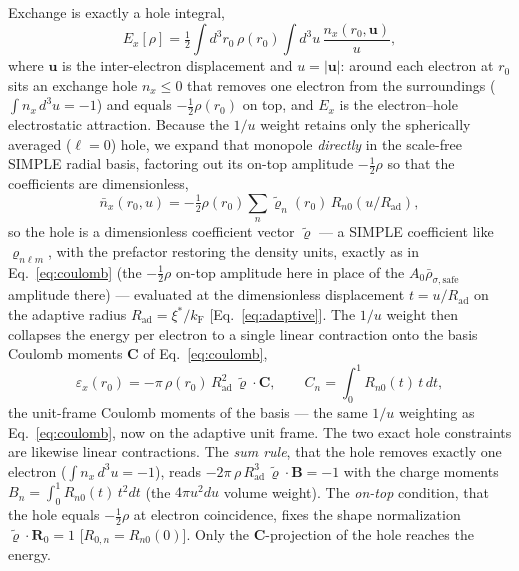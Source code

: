 \documentclass[aps,prb,reprint,superscriptaddress,nofootinbib]{revtex4-2}
\newcommand{\uu}{\mathbf{u}}
\newcommand{\kF}{k_{\mathrm{F}}}
\newcommand{\Rad}{R_{\mathrm{ad}}}
\begin{document}
Exchange is exactly a hole integral,
\begin{equation}
\label{eq:exact-hole}
E_x[\rho]=\tfrac12\int d^3r_0\,\rho(r_0)\!\int d^3u\,\frac{n_x(r_0,\uu)}{u},
\end{equation}
where $\uu$ is the inter-electron displacement and $u=|\uu|$: around each electron at $r_0$ sits an
exchange hole $n_x\le0$ that removes one electron from the surroundings ($\int n_x\,d^3u=-1$) and
equals $-\tfrac12\rho(r_0)$ on top, and $E_x$ is the electron--hole electrostatic attraction.
Because the $1/u$ weight retains only the spherically averaged ($\ell=0$) hole, we expand that
monopole \emph{directly} in the scale-free SIMPLE radial basis, factoring out its on-top amplitude
$-\tfrac12\rho$ so that the coefficients are dimensionless,
\begin{equation}
\label{eq:hole-direct}
\bar n_x(r_0,u)=-\tfrac12\rho(r_0)\sum_n \tilde\varrho_{n}(r_0)\,R_{n0}(u/\Rad),
\end{equation}
so the hole is a dimensionless coefficient vector $\tilde{\bm\varrho}$ --- a SIMPLE coefficient like
$\varrho_{n\ell m}$, with the prefactor restoring the density units, exactly as in
Eq.~\eqref{eq:coulomb} (the $-\tfrac12\rho$ on-top amplitude here in place of the
$A_0\bar\rho_{\sigma,\mathrm{safe}}$ amplitude there) --- evaluated at the dimensionless displacement
$t=u/\Rad$ on the adaptive radius $\Rad=\xi^*/\kF$ [Eq.~\eqref{eq:adaptive}]. The $1/u$ weight then
collapses the energy per electron
to a single linear contraction onto the basis Coulomb moments $\mathbf C$ of Eq.~\eqref{eq:coulomb},
\begin{equation}
\label{eq:eps-direct}
\varepsilon_x(r_0)=-\pi\,\rho(r_0)\,\Rad^2\,\tilde{\bm\varrho}\!\cdot\!\mathbf C,\qquad
C_{n}=\!\int_0^1\!R_{n0}(t)\,t\,dt ,
\end{equation}
the unit-frame Coulomb moments of the basis --- the same $1/u$ weighting as
Eq.~\eqref{eq:coulomb}, now on the adaptive unit frame. The two exact hole constraints are likewise
linear contractions. The \emph{sum rule}, that the hole removes exactly one electron
($\int n_x\,d^3u=-1$), reads $-2\pi\,\rho\,\Rad^3\,\tilde{\bm\varrho}\!\cdot\!\mathbf B=-1$ with the
charge moments $B_{n}=\int_0^1 R_{n0}(t)\,t^2dt$ (the $4\pi u^2du$ volume weight). The \emph{on-top}
condition, that the hole equals $-\tfrac12\rho$ at electron coincidence, fixes the shape
normalization $\tilde{\bm\varrho}\!\cdot\!\mathbf R_0=1$ [$R_{0,n}=R_{n0}(0)$]. Only the
$\mathbf C$-projection of the hole reaches the energy.
\end{document}
